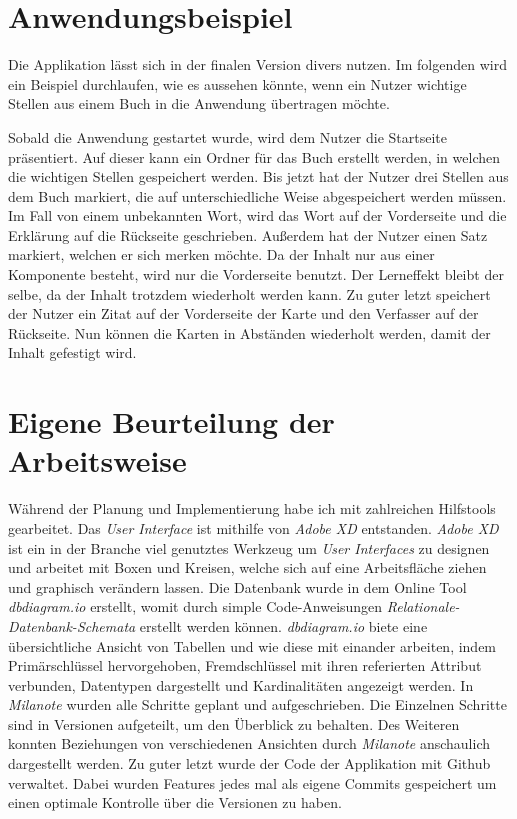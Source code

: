 \section{Anwendungsbeispiel}
\label{section:anwendungsbeispiel}

Die Applikation lässt sich in der finalen Version divers nutzen. Im folgenden wird ein Beispiel durchlaufen, wie es aussehen könnte, wenn ein Nutzer wichtige Stellen aus einem Buch in die Anwendung übertragen möchte.

Sobald die Anwendung gestartet wurde, wird dem Nutzer die Startseite präsentiert. Auf dieser kann ein Ordner für das Buch erstellt werden, in welchen die wichtigen Stellen gespeichert werden. Bis jetzt hat der Nutzer drei Stellen aus dem Buch markiert, die auf unterschiedliche Weise abgespeichert werden müssen. Im Fall von einem unbekannten Wort, wird das Wort auf der Vorderseite und die Erklärung auf die Rückseite geschrieben. Außerdem hat der Nutzer einen Satz markiert, welchen er sich merken möchte. Da der Inhalt nur aus einer Komponente besteht, wird nur die Vorderseite benutzt. Der Lerneffekt bleibt der selbe, da der Inhalt trotzdem wiederholt werden kann. Zu guter letzt speichert der Nutzer ein Zitat auf der Vorderseite der Karte und den Verfasser auf der Rückseite. Nun können die Karten in Abständen wiederholt werden, damit der Inhalt gefestigt wird.

\section{Eigene Beurteilung der Arbeitsweise}
Während der Planung und Implementierung habe ich mit zahlreichen Hilfstools gearbeitet. Das \textit{User Interface} ist mithilfe von \textit{Adobe XD} entstanden. \textit{Adobe XD} ist ein in der Branche viel genutztes Werkzeug um \textit{User Interfaces} zu designen und arbeitet mit Boxen und Kreisen, welche sich auf eine Arbeitsfläche ziehen und graphisch verändern lassen. Die Datenbank wurde in dem Online Tool \textit{dbdiagram.io} erstellt, womit durch simple Code-Anweisungen \textit{Relationale-Datenbank-Schemata} erstellt werden können. \textit{dbdiagram.io} biete eine übersichtliche Ansicht von Tabellen und wie diese mit einander arbeiten, indem Primärschlüssel hervorgehoben, Fremdschlüssel mit ihren referierten Attribut verbunden, Datentypen dargestellt und Kardinalitäten angezeigt werden. In \textit{Milanote} wurden alle Schritte geplant und aufgeschrieben. Die Einzelnen Schritte sind in Versionen aufgeteilt, um den Überblick zu behalten. Des Weiteren konnten Beziehungen von verschiedenen Ansichten durch \textit{Milanote} anschaulich dargestellt werden. Zu guter letzt wurde der Code der Applikation mit Github verwaltet. Dabei wurden Features jedes mal als eigene Commits gespeichert um einen optimale Kontrolle über die Versionen zu haben.

